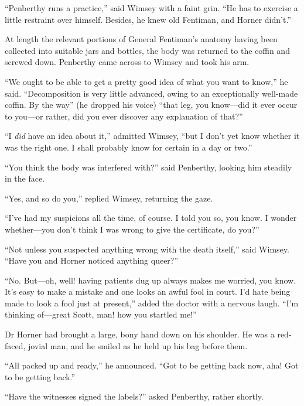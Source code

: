 \enquote{Penberthy runs a practice,} said Wimsey with a faint grin. \enquote{He has to exercise a little restraint over himself. Besides, he knew old Fentiman, and Horner didn't.}

At length the relevant portions of General Fentiman's anatomy having been collected into suitable jars and bottles, the body was returned to the coffin and screwed down. Penberthy came across to Wimsey and took his arm.

\enquote{We ought to be able to get a pretty good idea of what you want to know,} he said. \enquote{Decomposition is very little advanced, owing to an exceptionally well-made coffin. By the way} (he dropped his voice) \enquote{that leg, you know\allowbreak---\allowbreak did it ever occur to you\allowbreak---\allowbreak or rather, did you ever discover any explanation of that?}

\enquote{I \textit{did} have an idea about it,} admitted Wimsey, \enquote{but I don't yet know whether it was the right one. I shall probably know for certain in a day or two.}

\enquote{You think the body was interfered with?} said Penberthy, looking him steadily in the face.

\enquote{Yes, and so do you,} replied Wimsey, returning the gaze.

\enquote{I've had my suspicions all the time, of course. I told you so, you know. I wonder whether\allowbreak---\allowbreak you don't think I was wrong to give the certificate, do you?}

\enquote{Not unless you suspected anything wrong with the death itself,} said Wimsey. \enquote{Have you and Horner noticed anything queer?}

\enquote{No. But\allowbreak---\allowbreak oh, well! having patients dug up always makes me worried, you know. It's easy to make a mistake and one looks an awful fool in court. I'd hate being made to look a fool just at present,} added the doctor with a nervous laugh. \enquote{I'm thinking of\allowbreak---\allowbreak great Scott, man! how you startled me!}

Dr Horner had brought a large, bony hand down on his shoulder. He was a red-faced, jovial man, and he smiled as he held up his bag before them.

\enquote{All packed up and ready,} he announced. \enquote{Got to be getting back now, aha! Got to be getting back.}

\enquote{Have the witnesses signed the labels?} asked Penberthy, rather shortly.


